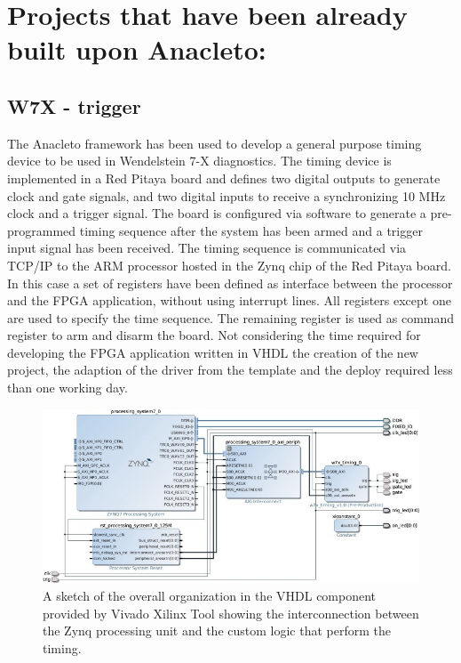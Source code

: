 \section{Projects that have been already built upon Anacleto:}
\subsection{W7X - trigger }
\label{section:W7X}
\cite{RIGONI2018122}
The Anacleto framework has been used to develop a general purpose timing device to be used in Wendelstein 7-X diagnostics. The timing device is implemented in a Red Pitaya board and defines two digital outputs to generate clock and gate signals, and two digital inputs to receive a synchronizing 10 MHz clock and a trigger signal. The board is configured via software to generate a pre-programmed timing sequence after the system has been armed and a trigger input signal has been received. The timing sequence is communicated via TCP/IP to the ARM processor hosted in the Zynq chip of the Red Pitaya board. In this case a set of registers have been defined as interface between the processor and the FPGA application, without using interrupt lines. All registers except one are used to specify the time sequence. The remaining register is used as command register to arm and disarm the board. Not considering the time required for developing the FPGA application written in VHDL the creation of the new project, the adaption of the driver from the template and the deploy required less than one working day.

\begin{figure}
    \centering
    \includegraphics{img/APPENDIX/W7X_VHDL.jpg}
    \caption{A sketch of the overall organization in the VHDL component provided by Vivado Xilinx Tool showing the interconnection between the Zynq processing unit and the custom logic that perform the timing. }
    \label{fig:W7X}
\end{figure}


